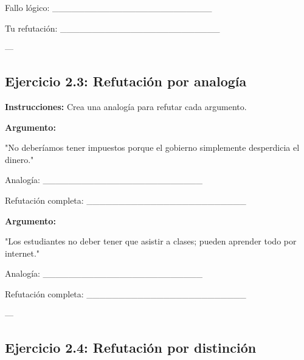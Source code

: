 \documentclass[a4paper,11pt]{article}
\begin{document}
\vspace{0.2cm}

Fallo lógico: _________________________

\vspace{0.2cm}

Tu refutación: _________________________

\vspace{0.2cm}

---

\vspace{0.2cm}

\subsection{Ejercicio 2.3: Refutación por analogía}

\vspace{0.2cm}

\textbf{Instrucciones:} Crea una analogía para refutar cada argumento.

\vspace{0.2cm}

\textbf{Argumento:}

"No deberíamos tener impuestos porque el gobierno simplemente desperdicia el dinero."

\vspace{0.2cm}

Analogía: _________________________

\vspace{0.2cm}

Refutación completa: _________________________

\vspace{0.2cm}

\textbf{Argumento:}

"Los estudiantes no deber tener que asistir a clases; pueden aprender todo por internet."

\vspace{0.2cm}

Analogía: _________________________

\vspace{0.2cm}

Refutación completa: _________________________

\vspace{0.2cm}

---

\vspace{0.2cm}

\subsection{Ejercicio 2.4: Refutación por distinción}
\end{document}

